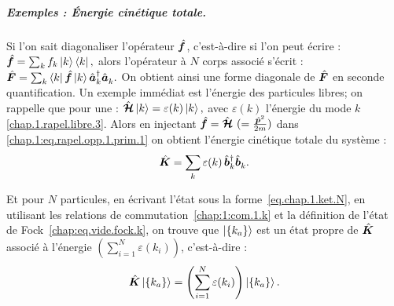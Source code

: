 \begin{mdframed}[
	linewidth=0.5pt, 
	backgroundcolor=gray!5, 
	roundcorner=50pt,	
	innerleftmargin=5pt,
    innerrightmargin=5pt,
    innertopmargin=-10pt,
    innerbottommargin=2pt,
    leftmargin=2pt,
    rightmargin=2pt
	]
\subparagraph{Exemples : Énergie cinétique totale.}

Si l’on sait diagonaliser l’opérateur \( \hat{\bm{f}} \), c’est-à-dire si l’on peut écrire :
\(
	\hat{\bm{f}} = \sum_k f_k \ket{k} \bra{k},
\)
alors l’opérateur à $N$ corps associé s’écrit :
\(
	\hat{\bm{F}} = \sum_k \bra{k} \hat{\bm{f}} \ket{k} \hat{\bm{a}}^\dagger_k \hat{\bm{a}}_k^{}.
\)
On obtient ainsi une forme diagonale de \( \hat{\bm{F}} \) en seconde quantification.
Un exemple immédiat est l'énergie des particules libres; on rappelle que pour une :
\(
	\hat{\bm{\mathcal{H}}} \ket{k} = \varepsilon(k) \ket{k},
\)
avec $\varepsilon(k)$ l'énergie du mode $k$ \eqref{chap.1.rapel.libre.3}.
Alors en injectant $\hat{\bm{f}} = \hat{\bm{\mathcal{H}}} ~( = \frac{\hat{\bm{p}}^2}{2m})$ dans \eqref{chap.1:eq.rapel.opp.1.prim.1} on obtient l’énergie cinétique totale du système :
\begin{equation}
	\hat{\bm{K}} = \sum_{k} \varepsilon(k) \, \hat{\bm{b}}^\dagger_k \hat{\bm{b}}_k^{}.\label{eq.chap.1.cinietique.1}
\end{equation}

Et pour $N$ particules, en écrivant l’état sous la forme~\eqref{eq.chap.1.ket.N}, en utilisant les relations de commutation~\eqref{chap:1:com.1.k} et la définition de l’état de Fock~\eqref{chap:eq.vide.fock.k}, on trouve que $\ket{\{k_a\}}$ est un état propre de $\hat{\bm{K}}$ associé à l'énergie $\left( \sum_{i = 1}^N \varepsilon(k_i) \right)$, c’est-à-dire :
\begin{eqnarray}
	\hat{\bm{K}} \ket{\{k_a\}} = \left( \sum_{i = 1}^N \varepsilon(k_i) \right) \ket{\{k_a\}}.\label{eq.chap.1.cinietique.2}
\end{eqnarray}
\end{mdframed}


